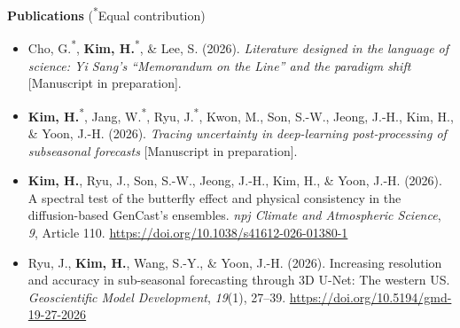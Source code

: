 \vspace{0.3em}
\noindent\textbf{Publications} {\footnotesize (\textsuperscript{*}Equal contribution)}
\vspace{-0.5em}
\begin{itemize}[itemsep=0pt, parsep=0pt]
    \item Cho, G.\textsuperscript{*}, \textbf{Kim, H.}\textsuperscript{*}, \& Lee, S. (2026). \textit{Literature designed in the language of science: Yi Sang's ``Memorandum on the Line'' and the paradigm shift} [Manuscript in preparation].

    \item \textbf{Kim, H.}\textsuperscript{*}, Jang, W.\textsuperscript{*}, Ryu, J.\textsuperscript{*}, Kwon, M., Son, S.-W., Jeong, J.-H., Kim, H., \& Yoon, J.-H. (2026). \textit{Tracing uncertainty in deep-learning post-processing of subseasonal forecasts} [Manuscript in preparation].

    \item \textbf{Kim, H.}, Ryu, J., Son, S.-W., Jeong, J.-H., Kim, H., \& Yoon, J.-H. (2026). A spectral test of the butterfly effect and physical consistency in the diffusion-based GenCast's ensembles. \textit{npj Climate and Atmospheric Science}, \textit{9}, Article 110. \href{https://doi.org/10.1038/s41612-026-01380-1}{https://doi.org/10.1038/s41612-026-01380-1}

    \item Ryu, J., \textbf{Kim, H.}, Wang, S.-Y., \& Yoon, J.-H. (2026). Increasing resolution and accuracy in sub-seasonal forecasting through 3D U-Net: The western US. \textit{Geoscientific Model Development}, \textit{19}(1), 27--39. \href{https://doi.org/10.5194/gmd-19-27-2026}{https://doi.org/10.5194/gmd-19-27-2026}
\end{itemize}

